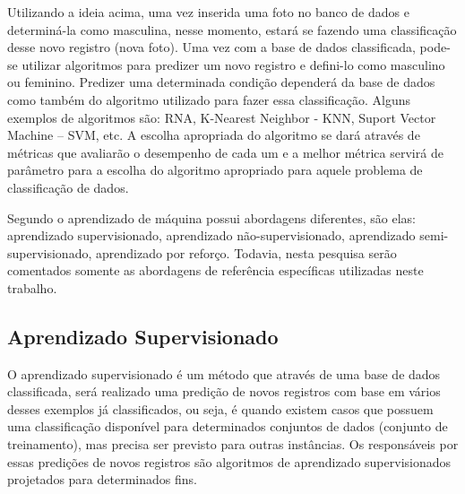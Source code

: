 Utilizando a ideia acima, uma vez inserida uma foto no banco de dados e determiná-la como masculina, nesse momento, estará se fazendo uma classificação desse novo registro (nova foto). Uma vez com a base de dados classificada, pode-se utilizar algoritmos para predizer um novo registro e defini-lo como masculino ou feminino. Predizer uma determinada condição dependerá da base de dados como também do algoritmo utilizado para fazer essa classificação. Alguns exemplos de algoritmos são: RNA, K-Nearest Neighbor - KNN, Suport Vector Machine – SVM, etc. A escolha apropriada do algoritmo se dará através de métricas que avaliarão o desempenho de cada um e a melhor métrica servirá de parâmetro para a escolha do algoritmo apropriado para aquele problema de classificação de dados. 


Segundo \cite{Mohri2012} o aprendizado de máquina possui abordagens diferentes, são elas: aprendizado supervisionado, aprendizado não-supervisionado, aprendizado semi-supervisionado, aprendizado por reforço. Todavia, nesta pesquisa serão comentados somente as abordagens de referência específicas utilizadas neste trabalho.

\subsection{Aprendizado Supervisionado}\label{cap:refTeor:ssec:aprendSup}

O aprendizado supervisionado é um método que através de uma base de dados classificada, será realizado uma predição de novos registros com base em vários desses exemplos já classificados, ou seja, é quando existem casos que possuem uma classificação disponível para determinados conjuntos de dados (conjunto de treinamento), mas precisa ser previsto para outras instâncias. Os responsáveis por essas predições de novos registros são algoritmos de aprendizado supervisionados projetados para determinados fins.

